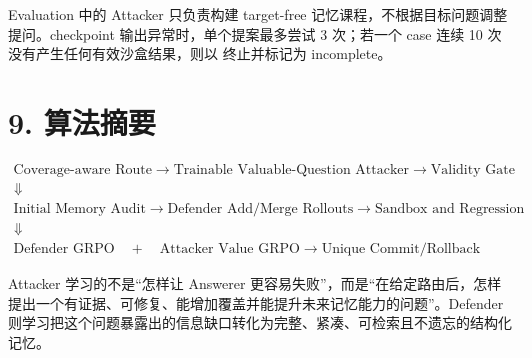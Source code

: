 \documentclass[a4paper,11pt]{article}
\begin{document}
Evaluation 中的 Attacker 只负责构建 target-free 记忆课程，不根据目标问题调整提问。checkpoint 输出异常时，单个提案最多尝试 3 次；若一个 case 连续 10 次没有产生任何有效沙盒结果，则以
 终止并标记为 incomplete。

\section*{9. 算法摘要}

\begin{implbox}
\[
\boxed{
\begin{gathered}
\text{Coverage-aware Route}
\rightarrow
\text{Trainable Valuable-Question Attacker}
\rightarrow
\text{Validity Gate}\\
\Downarrow\\
\text{Initial Memory Audit}
\rightarrow
\text{Defender Add/Merge Rollouts}
\rightarrow
\text{Sandbox and Regression}\\
\Downarrow\\
\text{Defender GRPO}
\quad+\quad
\text{Attacker Value GRPO}
\rightarrow
\text{Unique Commit/Rollback}
\end{gathered}
}
\]

Attacker 学习的不是“怎样让 Answerer 更容易失败”，而是“在给定路由后，怎样提出一个有证据、可修复、能增加覆盖并能提升未来记忆能力的问题”。Defender 则学习把这个问题暴露出的信息缺口转化为完整、紧凑、可检索且不遗忘的结构化记忆。
\end{implbox}
\end{document}
